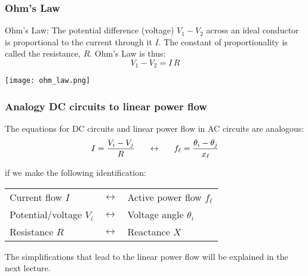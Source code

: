 \documentclass[10pt,aspectratio=169,dvipsnames]{beamer}
\newcommand{\ra}[1]{\renewcommand{\arraystretch}{#1}}
\begin{document}
\begin{frame}
  \frametitle{Ohm's Law}

  \alert{Ohm's Law}: The potential difference (voltage) $V_1 - V_2$ across an ideal conductor is proportional to the current through it $I$. The constant of proportionality is called the \alert{resistance}, $R$. Ohm's Law is thus:
  \begin{equation*}
     V_1 - V_2 = I\,R
  \end{equation*}

  \centering
  \texttt{[image: ohm\_law.png]}


\end{frame}

\begin{frame}
  \frametitle{Analogy DC circuits to linear power flow}

  The equations for DC circuits and linear power flow in AC circuits are analogous:
  \begin{equation*}
    I = \frac{V_i - V_j}{R} \hspace{.55cm} \leftrightarrow \hspace{.55cm} f_\ell =  \frac{\theta_i - \theta_j}{x_\ell}
  \end{equation*}

  if we make the following identification:
    \ra{1.05}
  \begin{table}[!t]
    \begin{tabular}{p{4cm}p{0.5cm}p{4cm}}
      \toprule
      Current flow $I$ & $\leftrightarrow$  &  Active power flow $f_\ell$ \\
      Potential/voltage $V_i$ & $\leftrightarrow$  &  Voltage angle $\theta_i$ \\
      Resistance $R$ & $\leftrightarrow$  &  Reactance $X$ \\
      \bottomrule
    \end{tabular}
  \end{table}

  The simplifications that lead to the linear power flow will be explained in the next lecture.

\end{frame}
\end{document}
